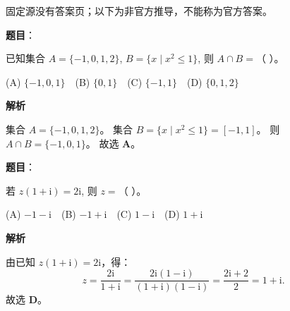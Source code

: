 
\begin{gktip}
固定源没有答案页；以下为非官方推导，不能称为官方答案。
\end{gktip}


\begin{answer}

\textbf{题目}：

已知集合 $A = \{-1, 0, 1, 2\}$, $B = \{x \mid x^2 \leqslant 1\}$, 则 $A \cap B =$（ ）。

(A) $\{-1, 0, 1\}$　(B) $\{0, 1\}$　(C) $\{-1, 1\}$　(D) $\{0, 1, 2\}$

\textbf{解析}

集合 $A = \{-1, 0, 1, 2\}$。
集合 $B = \{x \mid x^2 \leqslant 1\} = [-1, 1]$。
则 $A \cap B = \{-1, 0, 1\}$。
故选 \textbf{A}。


\end{answer}
\begin{answer}

\textbf{题目}：

若 $z(1 + \mathrm{i}) = 2\mathrm{i}$, 则 $z =$（ ）。

(A) $-1 - \mathrm{i}$　(B) $-1 + \mathrm{i}$　(C) $1 - \mathrm{i}$　(D) $1 + \mathrm{i}$

\textbf{解析}

由已知 $z(1 + \mathrm{i}) = 2\mathrm{i}$，得：
\nopagebreak[4]
\[z = \frac{2\mathrm{i}}{1 + \mathrm{i}} = \frac{2\mathrm{i}(1 - \mathrm{i})}{(1 + \mathrm{i})(1 - \mathrm{i})} = \frac{2\mathrm{i} + 2}{2} = 1 + \mathrm{i}.\]
故选 \textbf{D}。


\end{answer}
